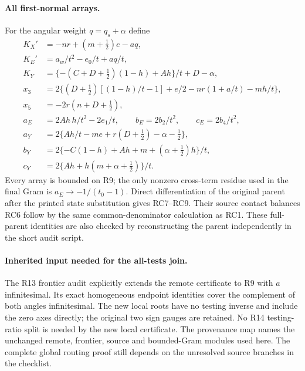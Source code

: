 \paragraph{All first-normal arrays.}
For the angular weight $q=q_s+\alpha$ define
\[
\begin{aligned}
K_X'&=-nr+(m+\tfrac12)e-aq,\\
K_E'&=a_w/t^2-e_0/t+aq/t,\\
K_Y&=\{-(C+D+\tfrac12)(1-h)+Ah\}/t+D-\alpha,\\
x_3&=2\{(D+\tfrac12)[(1-h)/t-1]+e/2-nr(1+a/t)-mh/t\},\\
x_5&=-2r(n+D+\tfrac12),\\
a_E&=2Ah\,h/t^2-2e_1/t,\qquad b_E=2b_2/t^2,\qquad c_E=2b_4/t^2,\\
a_Y&=2\{Ah/t-me+r(D+\tfrac12)-\alpha-\tfrac12\},\\
b_Y&=2\{-C(1-h)+Ah+m+(\alpha+\tfrac12)h\}/t,\\
c_Y&=2\{Ah+h(m+\alpha+\tfrac12)\}/t.
\end{aligned}
\]
Every array is bounded on R9; the only nonzero cross-term residue
used in the final Gram is $a_E\to-1/(t_0-1)$.
Direct differentiation of the original parent after the printed
state substitution gives RC7--RC9. Their source contact balances
RC6 follow by the same common-denominator calculation as RC1.
These full-parent identities are also checked by reconstructing the
parent independently in the short audit script.

\paragraph{Inherited input needed for the all-tests join.}
The R13 frontier audit explicitly extends the remote certificate to
R9 with $a$ infinitesimal. Its exact homogeneous endpoint identities
cover the complement of both angles infinitesimal. The new local
roots have no testing inverse and include the zero axes directly;
the original two sign gauges are retained.
No R14 testing-ratio split is needed by the new local certificate.
The provenance map names the unchanged remote, frontier, source and
bounded-Gram modules used here. The complete global routing proof
still depends on the unresolved source branches in the checklist.
